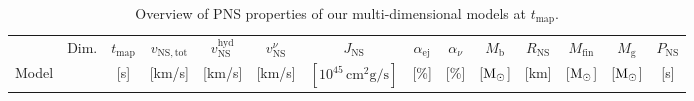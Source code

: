 \documentclass[fleqn,usenatbib]{mnras}
\newcommand{\solm}{\ensuremath{\rm{M_{\odot}}}\xspace}
\newcommand{\rns}{\ensuremath{R_{\mathrm{NS}}}\xspace}
\begin{document}
\begin{table}
\caption{Overview of PNS properties of our multi-dimensional models at $t_{\mathrm{map}}$.}
\label{tab:neutron star}
\begin{tabular}{ccccccccccc||ccc}
    \hline 
            & Dim. & 
              $t_{\mathrm{map}}$ & 
            $v_{\mathrm{NS,tot}}$ & 
            $v_{\mathrm{NS}}^{\mathrm{hyd}}$ & 
            $v_{\mathrm{NS}}^{\nu}$ &
            $J_{\mathrm{NS}}$    & 
            $\alpha_{\mathrm{ej}}$&
            $\alpha_{\nu}$&
            $M_{\mathrm{b}}$ &
            \rns &
            $M_{\mathrm{fin}}$ &
            $M_{\mathrm{g}}$ &
            $P_{\mathrm{NS}}$ 
            \\
    Model &
     &
    [s]   &
    [km/s] &
    [km/s] &
    [km/s] &
    $[10^{45}\, \mathrm{cm^2 g/s}]$ &
    [\%]              &  
    [\%]              &  
    [\solm]        &
    [km] &
    [\solm]         &
    [\solm]    &
    [s]     \\
    

\end{tabular}
\end{table}
\end{document}
